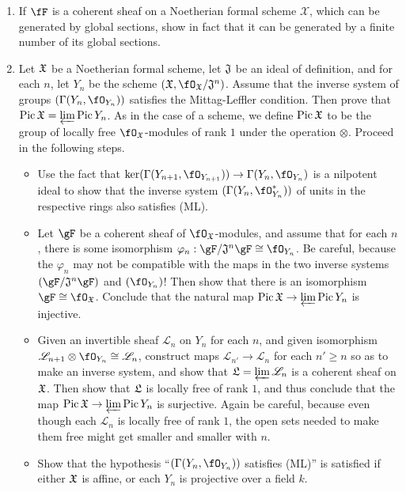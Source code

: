 \documentclass[a4paper]{article}
\begin{document}
\begin{enumerate} [label=\textbf{\arabic*.}, leftmargin=0em]
    \item If $\fF$ is a coherent sheaf on a Noetherian formal scheme $\mathscr{X}$, which can be generated by global sections, show in fact that it can be generated by a finite number of its global sections.

    \item Let $\mathfrak{X}$ be a Noetherian formal scheme, let $\mathfrak{J}$ be an ideal of definition, and for each $n$, let $Y_n$ be the scheme $(\goth{X}, \fO_\goth{X} / \goth{J}^n)$. Assume that the inverse system of groups $(\Gamma(Y_n, \fO_{Y_n}))$ satisfies the Mittag-Leffler condition. Then prove that $\operatorname{Pic}{\mathfrak{X}} = \varprojlim \operatorname{Pic}{Y_n}$. As in the case of a scheme, we define $\operatorname{Pic}{\mathfrak{X}}$ to be the group of locally free $\fO_\goth{X}$-modules of rank $1$ under the operation $\otimes$. Proceed in the following steps.
          \begin{itemize}
              \item[(a)] Use the fact that $\text{ker}(\Gamma(Y_{n + 1}, \fO_{Y_{n + 1}})) \to \Gamma(Y_n, \fO_{Y_n})$ is a nilpotent ideal to show that the inverse system $(\Gamma(Y_n, \fO_{Y_n}^*))$ of units in the respective rings also satisfies (ML).
              \item[(b)] Let $\gF$ be a coherent sheaf of $\fO_\goth{X}$-modules, and assume that for each $n$, there is some isomorphism $\varphi_n : \gF / \goth{J}^n \gF \cong \fO_{Y_n}$. Be careful, because the $\varphi_n$ may not be compatible with the maps in the two inverse systems $(\gF / \goth{J}^n \gF)$ and $(\fO_{Y_n})$! Then show that there is an isomorphism $\gF \cong \fO_\goth{X}$. Conclude that the natural map $\operatorname{Pic}{\mathfrak{X}} \to \varprojlim{\operatorname{Pic}{Y_n}}$ is injective.
              \item[(c)] Given an invertible sheaf $\mathscr{L}_n$ on $Y_n$ for each $n$, and given isomorphism $\mathscr{L}_{n + 1} \otimes \fO_{Y_n} \cong \mathscr{L}_n$, construct maps $\mathscr{L}_{n'} \to \mathscr{L}_n$ for each $n' \geq n$ so as to make an inverse system, and show that $\mathfrak{L} = \varprojlim \mathscr{L}_n$ is a coherent sheaf on $\mathfrak{X}$. Then show that $\mathfrak{L}$ is locally free of rank $1$, and thus conclude that the map $\operatorname{Pic}{\mathfrak{X}} \to \varprojlim \operatorname{Pic}{Y_n}$ is surjective. Again be careful, because even though each $\mathscr{L}_n$ is locally free of rank $1$, the open sets needed to make them free might get smaller and smaller with $n$.
              \item[(d)] Show that the hypothesis ``$(\Gamma(Y_n, \fO_{Y_n}))$ satisfies (ML)'' is satisfied if either $\mathfrak{X}$ is affine, or each $Y_n$ is projective over a field $k$.
          \end{itemize}

\end{enumerate}
\end{document}
